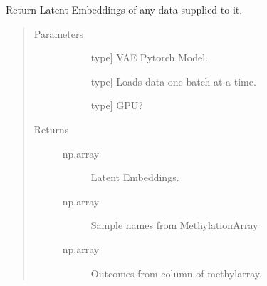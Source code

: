 \documentclass[letterpaper,10pt,english]{sphinxmanual}
\begin{document}

\begin{fulllineitems}
\label{\detokenize{index:methylnet.models.project_vae}}
Return Latent Embeddings of any data supplied to it.
\begin{quote}\begin{description}
\item[{Parameters}] \leavevmode\begin{description}
\item[{}] \leavevmode{[}type{]}
VAE Pytorch Model.

\item[{}] \leavevmode{[}type{]}
Loads data one batch at a time.

\item[{}] \leavevmode{[}type{]}
GPU?

\end{description}

\item[{Returns}] \leavevmode\begin{description}
\item[{np.array}] \leavevmode
Latent Embeddings.

\item[{np.array}] \leavevmode
Sample names from MethylationArray

\item[{np.array}] \leavevmode
Outcomes from column of methylarray.

\end{description}

\end{description}\end{quote}

\end{fulllineitems}

\end{document}
